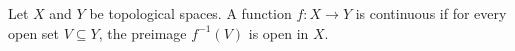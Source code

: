 \begin{dfn}
    Let \( X \) and \( Y \) be topological spaces. A function \( f: X \to Y \) is continuous if for every open set \( V \subseteq Y \), the preimage \( f^{-1} \left( V \right) \) is open in \( X \).
\end{dfn}